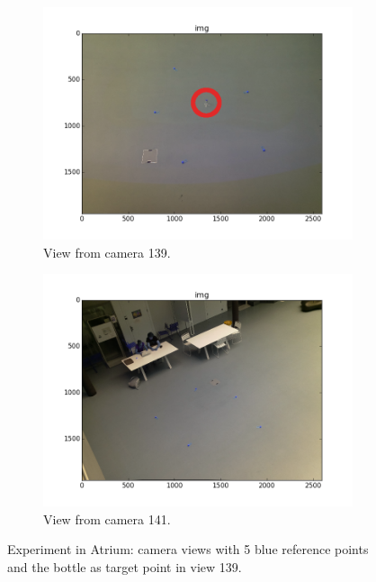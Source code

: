 \begin{figure}
    \centering
    \begin{subfigure}{0.49\linewidth}
        \includegraphics[width=\linewidth]{files/res0_img139.png}
        \caption{View from camera 139.}
        \label{fig:res0_img139}
    \end{subfigure}
    \begin{subfigure}{0.49\linewidth}
        \includegraphics[width=\linewidth]{files/res0_img141.png}
        \caption{View from camera 141. }
        \label{fig:res0_img141}
    \end{subfigure}
    \caption{Experiment in Atrium: camera views with 5 blue reference points and the bottle as target point in view 139.}
    \label{fig:res0_views}
\end{figure}


